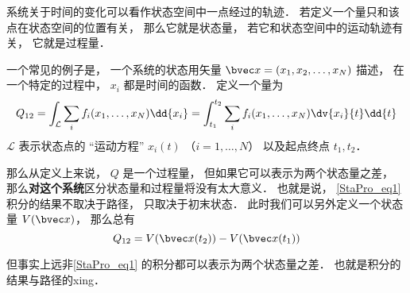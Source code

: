
\begin{issues}
\issueDraft
\end{issues}

系统关于时间的变化可以看作状态空间中一点经过的轨迹． 若定义一个量只和该点在状态空间的位置有关， 那么它就是状态量， 若它和状态空间中的运动轨迹有关， 它就是过程量．

一个常见的例子是， 一个系统的状态用矢量 $\bvec x = (x_1, x_2, \dots, x_N)$ 描述， 在一个特定的过程中， $x_i$ 都是时间的函数． 定义一个量为
\begin{equation}\label{StaPro_eq1}
Q_{12} = \int_{\mathcal L} \sum_i f_i(x_1, \dots, x_N) \dd{x_i} = \int_{t_1}^{t_2} \sum_i f_i(x_1, \dots, x_N) \dv{x_i}{t} \dd{t}
\end{equation}
$\mathcal L$ 表示状态点的 “运动方程” $x_i(t)$ （$i = 1,\dots, N$） 以及起点终点 $t_1, t_2$．

那么从定义上来说， $Q$ 是一个过程量， 但如果它可以表示为两个状态量之差， 那么\textbf{对这个系统}区分状态量和过程量将没有太大意义． 也就是说， \autoref{StaPro_eq1} 积分的结果不取决于路径， 只取决于初末状态． 此时我们可以另外定义一个状态量 $V(\bvec x)$， 那么总有
\begin{equation}
Q_{12} = V(\bvec x(t_2)) - V(\bvec x(t_1))
\end{equation}

但事实上远非\autoref{StaPro_eq1} 的积分都可以表示为两个状态量之差． 也就是积分的结果与路径的xing．
